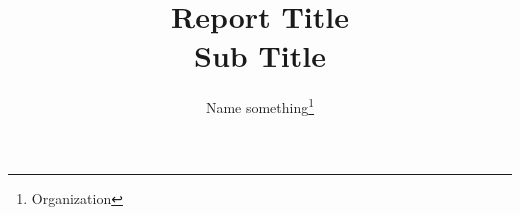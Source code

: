 \title{
  \textbf{
  Report Title\\
  Sub Title
  }
}
\author{
  \setcounter{footnote}{1}
  Name something\thanks{Organization}
}


  \maketitle
